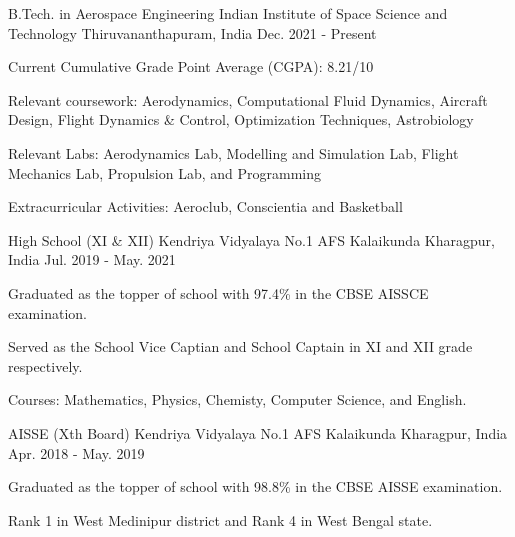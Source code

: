 

\begin{cventries}

  \cventry
  {B.Tech. in Aerospace Engineering} %
  {Indian Institute of Space Science and Technology} %
  {Thiruvananthapuram, India} %
  {Dec. 2021 - Present} %
  {
    \begin{cvitems} %
      \item {Current Cumulative Grade Point Average (CGPA): 8.21/10}
      \item {Relevant coursework: Aerodynamics, Computational Fluid Dynamics, Aircraft Design, Flight Dynamics \& Control, Optimization Techniques, Astrobiology}
      \item {Relevant Labs: Aerodynamics Lab, Modelling and Simulation Lab, Flight Mechanics Lab, Propulsion Lab, and Programming}
      \item {Extracurricular Activities: Aeroclub, Conscientia and Basketball}
    \end{cvitems}
  }

  \cventry
  {High School (XI \& XII)} %
  {Kendriya Vidyalaya No.1 AFS Kalaikunda} %
  {Kharagpur, India} %
  {Jul. 2019 - May. 2021} %
  {
    \begin{cvitems} %
      \item {Graduated as the topper of school with 97.4\% in the CBSE AISSCE examination.}
      \item {Served as the School Vice Captian and School Captain in XI and XII grade respectively.}
      \item {Courses: Mathematics, Physics, Chemisty, Computer Science, and English.}
    \end{cvitems}
  }

  \cventry
  {AISSE (Xth Board)} %
  {Kendriya Vidyalaya No.1 AFS Kalaikunda} %
  {Kharagpur, India} %
  {Apr. 2018 - May. 2019} %
  {
    \begin{cvitems} %
      \item {Graduated as the topper of school with 98.8\% in the CBSE AISSE examination.}
      \item {Rank 1 in West Medinipur district and Rank 4 in West Bengal state.}
    \end{cvitems}
  }

\end{cventries}

